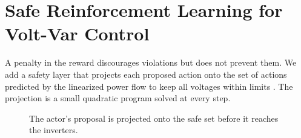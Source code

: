 \chapter{Safe Reinforcement Learning for Volt-Var Control}
\label{ch:method}

A penalty in the reward discourages violations but does not prevent them. We add a safety layer
that projects each proposed action onto the set of actions predicted by the linearized power
flow to keep all voltages within limits \citep{dalal2018}. The projection is a small quadratic
program solved at every step.

\begin{figure}[htbp]
  \centering
  \caption{The actor's proposal is projected onto the safe set before it reaches the inverters.}
  \label{fig:safe}
\end{figure}
